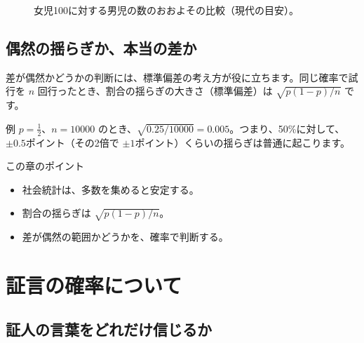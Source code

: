 \documentclass[a4paper,11pt,openany]{ltjsbook}
\begin{document}
\begin{figure}[htbp]
\centering
{}
\caption{女児100に対する男児の数のおおよその比較（現代の目安）。}
\end{figure}

\section{偶然の揺らぎか、本当の差か}

差が偶然かどうかの判断には、標準偏差の考え方が役に立ちます。同じ確率で試行を $n$ 回行ったとき、割合の揺らぎの大きさ（標準偏差）は $\sqrt{p(1-p)/n}$ です。

\begin{examplebox}{例}
$p=\frac12$、$n=10000$ のとき、$\sqrt{0.25/10000}=0.005$。つまり、50\%に対して、$\pm0.5$ポイント（その2倍で $\pm1$ポイント）くらいの揺らぎは普通に起こります。
\end{examplebox}

\begin{pointbox}{この章のポイント}
\begin{itemize}[leftmargin=1.5em]
\item 社会統計は、多数を集めると安定する。
\item 割合の揺らぎは $\sqrt{p(1-p)/n}$。
\item 差が偶然の範囲かどうかを、確率で判断する。
\end{itemize}
\end{pointbox}

\chapter{証言の確率について}

\section{証人の言葉をどれだけ信じるか}
\end{document}
